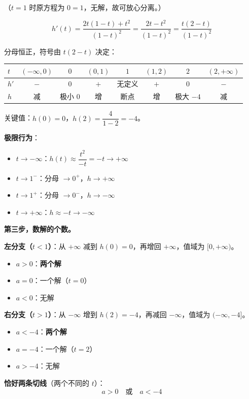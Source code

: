 （$t=1$ 时原方程为 $0=1$，无解，故可放心分离。）

\[h'(t)=\frac{2t(1-t)+t^{2}}{(1-t)^{2}}=\frac{2t-t^{2}}{(1-t)^{2}}=\frac{t(2-t)}{(1-t)^{2}}\]

分母恒正，符号由 $t(2-t)$ 决定：

\begin{center}
\begin{tabular}{lccccccc}
\toprule
$t$ & $(-\infty,0)$ & $0$ & $(0,1)$ & $1$ & $(1,2)$ & $2$ & $(2,+\infty)$ \\
\midrule
$h'$ & $-$ & $0$ & $+$ & 无定义 & $+$ & $0$ & $-$ \\
$h$ & 减 & 极小 $0$ & 增 & 断点 & 增 & 极大 $-4$ & 减 \\
\bottomrule
\end{tabular}
\end{center}

关键值：$h(0)=0$，$h(2)=\dfrac4{1-2}=-4$。

\textbf{极限行为}：
\begin{itemize}
\item $t\to-\infty$：$h(t)\approx\dfrac{t^{2}}{-t}=-t\to+\infty$
\item $t\to1^{-}$：分母 $\to0^{+}$，$h\to+\infty$
\item $t\to1^{+}$：分母 $\to0^{-}$，$h\to-\infty$
\item $t\to+\infty$：$h\approx-t\to-\infty$
\end{itemize}

\textbf{第三步，数解的个数。}

\textbf{左分支（$t<1$）}：从 $+\infty$ 减到 $h(0)=0$，再增回 $+\infty$，值域为 $[0,+\infty)$。
\begin{itemize}
\item $a>0$：\textbf{两个解}
\item $a=0$：一个解（$t=0$）
\item $a<0$：无解
\end{itemize}

\textbf{右分支（$t>1$）}：从 $-\infty$ 增到 $h(2)=-4$，再减回 $-\infty$，值域为 $(-\infty,-4]$。
\begin{itemize}
\item $a<-4$：\textbf{两个解}
\item $a=-4$：一个解（$t=2$）
\item $a>-4$：无解
\end{itemize}

\textbf{恰好两条切线}（两个不同的 $t$）：
\[a>0\quad\text{或}\quad a<-4\]

